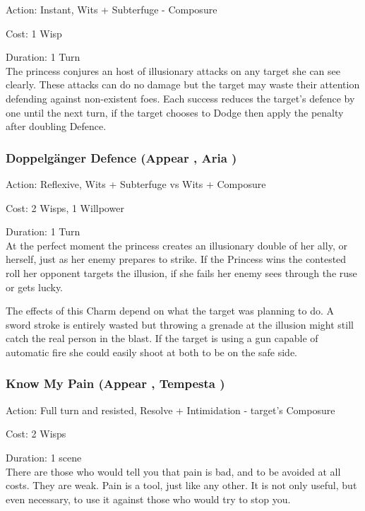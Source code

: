 \noindent Action: Instant, Wits + Subterfuge - Composure

\noindent Cost: 1 Wisp

\noindent Duration: 1 Turn\\

\noindent The princess conjures an host of illusionary attacks on any target she can see clearly. These attacks can do no damage but the target may waste their attention defending against non-existent foes. Each success reduces the target's defence by one until the next turn, if the target chooses to Dodge then apply the penalty after doubling Defence.


\subsubsection*{Doppelgänger Defence (Appear \textbullet\textbullet\textbullet, Aria \textbullet\textbullet\textbullet)}
\noindent Action: Reflexive, Wits + Subterfuge vs Wits + Composure

\noindent Cost: 2 Wisps, 1 Willpower

\noindent Duration: 1 Turn\\

\noindent At the perfect moment the princess creates an illusionary double of her ally, or herself, just as her enemy prepares to strike. If the Princess wins the contested roll her opponent targets the illusion, if she fails her enemy sees through the ruse or gets lucky.

The effects of this Charm depend on what the target was planning to do. A sword stroke is entirely wasted but throwing a grenade at the illusion might still catch the real person in the blast. If the target is using a gun capable of automatic fire she could easily shoot at both to be on the safe side.


\subsubsection*{Know My Pain (Appear \textbullet\textbullet\textbullet, Tempesta \textbullet\textbullet)}
\noindent Action: Full turn and resisted, Resolve + Intimidation - target's Composure

\noindent Cost: 2 Wisps

\noindent Duration: 1 scene\\ 

\noindent There are those who would tell you that pain is bad, and to be avoided at all costs. They are weak. Pain is a tool, just like any other. It is not only useful, but even necessary, to use it against those who would try to stop you.

